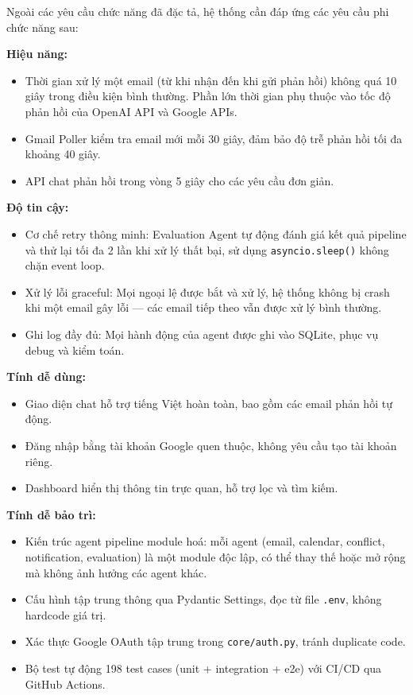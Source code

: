\documentclass[../DoAn.tex]{subfiles}
\begin{document}
Ngoài các yêu cầu chức năng đã đặc tả, hệ thống cần đáp ứng các yêu cầu phi chức năng sau:

\textbf{Hiệu năng:}
\begin{itemize}
    \item Thời gian xử lý một email (từ khi nhận đến khi gửi phản hồi) không quá 10 giây trong điều kiện bình thường. Phần lớn thời gian phụ thuộc vào tốc độ phản hồi của OpenAI API và Google APIs.
    \item Gmail Poller kiểm tra email mới mỗi 30 giây, đảm bảo độ trễ phản hồi tối đa khoảng 40 giây.
    \item API chat phản hồi trong vòng 5 giây cho các yêu cầu đơn giản.
\end{itemize}

\textbf{Độ tin cậy:}
\begin{itemize}
    \item Cơ chế retry thông minh: Evaluation Agent tự động đánh giá kết quả pipeline và thử lại tối đa 2 lần khi xử lý thất bại, sử dụng \texttt{asyncio.sleep()} không chặn event loop.
    \item Xử lý lỗi graceful: Mọi ngoại lệ được bắt và xử lý, hệ thống không bị crash khi một email gây lỗi — các email tiếp theo vẫn được xử lý bình thường.
    \item Ghi log đầy đủ: Mọi hành động của agent được ghi vào SQLite, phục vụ debug và kiểm toán.
\end{itemize}

\textbf{Tính dễ dùng:}
\begin{itemize}
    \item Giao diện chat hỗ trợ tiếng Việt hoàn toàn, bao gồm các email phản hồi tự động.
    \item Đăng nhập bằng tài khoản Google quen thuộc, không yêu cầu tạo tài khoản riêng.
    \item Dashboard hiển thị thông tin trực quan, hỗ trợ lọc và tìm kiếm.
\end{itemize}

\textbf{Tính dễ bảo trì:}
\begin{itemize}
    \item Kiến trúc agent pipeline module hoá: mỗi agent (email, calendar, conflict, notification, evaluation) là một module độc lập, có thể thay thế hoặc mở rộng mà không ảnh hưởng các agent khác.
    \item Cấu hình tập trung thông qua Pydantic Settings, đọc từ file \texttt{.env}, không hardcode giá trị.
    \item Xác thực Google OAuth tập trung trong \texttt{core/auth.py}, tránh duplicate code.
    \item Bộ test tự động 198 test cases (unit + integration + e2e) với CI/CD qua GitHub Actions.
\end{itemize}
\end{document}
